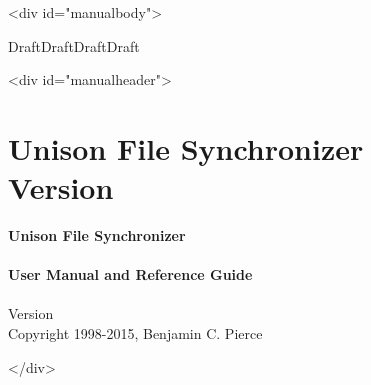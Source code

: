 \documentclass{article}
\begin{document}
\ifhevea\begin{rawhtml}<div id="manualbody">\end{rawhtml}\fi

\ifhevea\else\bigskip\fi%
\ifdraft%
\begin{center}%
{\Huge \ifhevea\red\fi DraftDraftDraftDraft}%
\end{center}%
\ifhevea\else \bigskip \fi
\fi

\ifhevea\begin{rawhtml}<div id="manualheader">\end{rawhtml}%
\else \thispagestyle{empty}
\fi%
%
\iftextversion
  \section*{Unison File Synchronizer 
  \\
  Version
  \unisonversion 
  }
\else%
  \ifhevea\else \vspace*{2in} \fi%
  \begin{center}%
  \Huge{\ifhevea\black\else\bf \fi Unison File  Synchronizer}%
  \ifhevea \\ \else \\[2ex] \fi%
  \huge {\ifhevea\black\else\bf \fi User Manual and Reference Guide}%
  \ifhevea \\ \else \\[6ex] \fi%
  \LARGE%
  Version \unisonversion \\[4ex] %
  \large Copyright 1998-2015, Benjamin C. Pierce
  \end{center}%
\fi%
%
%
\ifhevea\begin{rawhtml}</div>\end{rawhtml}\fi

\ifhevea\else\newpage\fi 
\TABLEOFCONTENTS
\ifhevea\else\newpage\fi




\ifhevea\else\bigskip\fi

\end{document}
